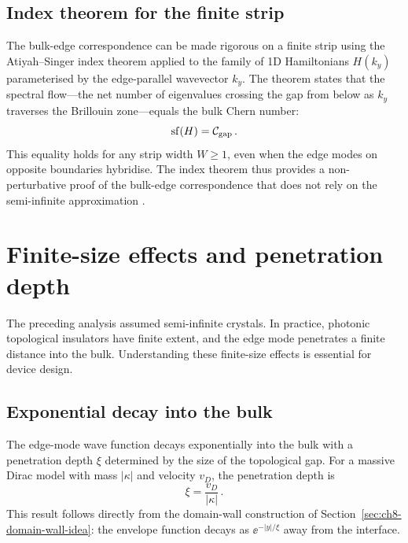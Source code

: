 \subsection{Index theorem for the finite strip}
\label{sec:ch8-index-strip}

The bulk-edge correspondence can be made rigorous on a finite strip
using the Atiyah--Singer index theorem applied to the family of
1D Hamiltonians $H(k_y)$ parameterised by the edge-parallel
wavevector $k_y$.  The theorem states that the spectral flow---the
net number of eigenvalues crossing the gap from below as $k_y$
traverses the Brillouin zone---equals the bulk Chern number:
\begin{equation}\label{eq:ch8-spectral-flow-index}
  \mathrm{sf}(H) = \mathcal{C}_{\mathrm{gap}}\,.
\end{equation}
This equality holds for any strip width $W\geq 1$, even when the
edge modes on opposite boundaries hybridise.  The index theorem thus
provides a non-perturbative proof of the bulk-edge correspondence that
does not rely on the semi-infinite approximation
\cite{thouless1982quantized,silveirinha2016bulk}.

\section{Finite-size effects and penetration depth}
\label{sec:ch8-penetration-depth}

The preceding analysis assumed semi-infinite crystals.  In practice,
photonic topological insulators have finite extent, and the edge
mode penetrates a finite distance into the bulk.  Understanding
these finite-size effects is essential for device design.

\subsection{Exponential decay into the bulk}
\label{sec:ch8-exponential-decay}

The edge-mode wave function decays exponentially into the bulk with
a penetration depth $\xi$ determined by the size of the topological
gap.  For a massive Dirac model with mass $|\kappa|$ and velocity
$v_D$, the penetration depth is
\begin{equation}\label{eq:ch8-penetration}
  \xi = \frac{v_D}{|\kappa|}\,.
\end{equation}
This result follows directly from the domain-wall construction of
Section~\ref{sec:ch8-domain-wall-idea}: the envelope function decays as
$\ee^{-|y|/\xi}$ away from the interface.

